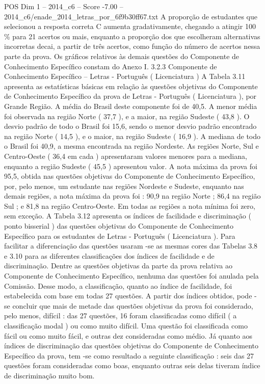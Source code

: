 \begin{textsample}{POS Dim 1 – 2014\_c6 – Score -7.00 – 2014\_c6/enade\_2014\_letras\_por\_6f9b30ff67.txt}
A proporção de estudantes que selecionou a resposta correta C aumenta gradativamente, chegando a atingir 100 \% para 21 acertos ou mais, enquanto a proporção dos que escolheram alternativas incorretas decai, a partir de três acertos, como função do número de acertos nessa parte da prova.
Os gráficos relativos às demais questões do Componente de Conhecimento Específico constam do Anexo I. 3.2.3 Componente de Conhecimento Específico – Letras - Português ( Licenciatura ) A Tabela 3.11 apresenta as estatísticas básicas em relação às questões objetivas do Componente de Conhecimento Específico da prova de Letras - Português ( Licenciatura ), por Grande Região.
A média do Brasil deste componente foi de 40,5.
A menor média foi observada na região Norte ( 37,7 ), e a maior, na região Sudeste ( 43,8 ).
O desvio padrão de todo o Brasil foi 15,6, sendo o menor desvio padrão encontrado na região Norte ( 14,5 ), e o maior, na região Sudeste ( 16,9 ).
A mediana de todo o Brasil foi 40,9, a mesma encontrada na região Nordeste.
As regiões Norte, Sul e Centro-Oeste ( 36,4 em cada ) apresentaram valores menores para a mediana, enquanto a região Sudeste ( 45,5 ) apresentou valor.
A nota máxima da prova foi 95,5, obtida nas questões objetivas do Componente de Conhecimento Específico, por, pelo menos, um estudante nas regiões Nordeste e Sudeste, enquanto nas demais regiões, a nota máxima da prova foi : 90,9 na região Norte ; 86,4 na região Sul ; e 81,8 na região Centro-Oeste.
Em todas as regiões a nota mínima foi zero, sem exceção.
A Tabela 3.12 apresenta os índices de facilidade e discriminação ( ponto bisserial ) das questões objetivas do Componente de Conhecimento Específico para os estudantes de Letras - Português ( Licenciatura ).
Para facilitar a diferenciação das questões usaram -se as mesmas cores das Tabelas 3.8 e 3.10 para as diferentes classificações dos índices de facilidade e de discriminação.
Dentre as questões objetivas da parte da prova relativa ao Componente de Conhecimento Específico, nenhuma das questões foi anulada pela Comissão.
Desse modo, a classificação, quanto ao índice de facilidade, foi estabelecida com base em todas 27 questões.
A partir dos índices obtidos, pode -se concluir que mais de metade das questões objetivas da prova foi considerado, pelo menos, difícil : das 27 questões, 16 foram classificadas como difícil ( a classificação modal ) ou como muito difícil.
Uma questão foi classificada como fácil ou como muito fácil, e outras dez consideradas como médio.
Já quanto aos índices de discriminação das questões objetivas do Componente de Conhecimento Específico da prova, tem -se como resultado a seguinte classificação : seis das 27 questões foram consideradas como boas, enquanto outras seis delas tiveram índice de discriminação muito bom.

\end{textsample}
